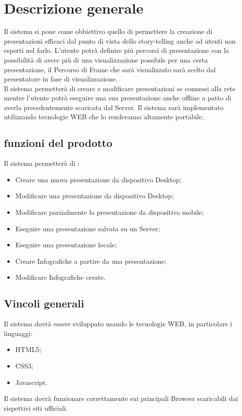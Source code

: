 \section{Descrizione generale}{
Il sistema si pone come obbiettivo quello di permettere la creazione di presentazioni efficaci dal punto di vista dello story-telling anche ad utenti non esperti nel farlo.
L'utente potrà definire più percorsi di presentazione con la possibilità di avere più di una visualizzazione possibile per una certa presentazione, il Percorso di Frame che sarà visualizzato sarà scelto dal presentatore in fase di visualizzazione.\\
Il sistema permetterà di creare e modificare presentazioni se connessi alla rete mentre l'utente potrà eseguire una sua presentazione anche offline a patto di averla precedentemente scaricata dal Server.
Il sistema sarà implementato utilizzando tecnologie WEB che lo renderanno altamente portabile.

\subsection{funzioni del prodotto}{
	Il sistema permetterà di :
	\begin{itemize}
		\item Creare una nuova presentazione da dispositivo Desktop;
		\item Modificare una presentazione da dispositivo Desktop;
		\item Modificare parzialmente la presentazione da dispositivo mobile;
		\item Eseguire una presentazione salvata su un Server;
		\item Eseguire una presentazione locale;
		\item Creare Infografiche a partire da una presentazione;
		\item Modificare Infografiche create.
	\end{itemize}
}
\subsection{Vincoli generali}{
	Il sistema dovrà essere sviluppato usando le tecnologie WEB, in particolare i linguaggi:
	\begin{itemize}
		\item HTML5;
		\item CSS3;
		\item Javascript.
	\end{itemize}
	
	\noindent
	Il sistema dovrà funzionare correttamente sui principali Browser scaricabili dai rispettivi siti ufficiali.
	}
}